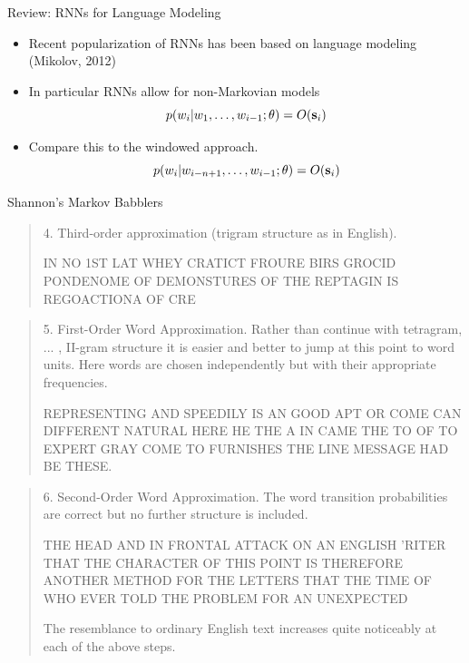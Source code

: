 \documentclass{beamer}
\begin{document}
\begin{frame}{Review: RNNs for Language Modeling}
  \begin{itemize}
  \item Recent popularization of RNNs has been based on language modeling (Mikolov, 2012)
    \air

  \item In particular RNNs allow for non-Markovian models
    \[ p(w_i | w_1, \ldots, w_{i-1};\theta) = O(\mathbf{s}_i) \]

    \air 

  \item Compare this to the windowed approach.
    \[ p(w_i | w_{i-n+1}, \ldots, w_{i-1};\theta) = O(\mathbf{s}_i) \]
  \end{itemize}
\end{frame}

\begin{frame}[allowframebreaks]{Shannon's Markov Babblers}

  \begin{quote}
   
  4. Third-order approximation (trigram structure as in English).

IN NO 1ST LAT WHEY CRATICT FROURE BIRS GROCID
PONDENOME OF DEMONSTURES OF THE REPTAGIN IS
REGOACTIONA OF CRE
  \end{quote}

  \begin{quote}
5. First-Order Word Approximation. Rather than continue with tetragram,
... , II-gram structure it is easier and better to jump at this
point to word units. Here words are chosen independently but with
their appropriate frequencies.

REPRESENTING AND SPEEDILY IS AN GOOD APT OR
COME CAN DIFFERENT NATURAL HERE HE THE A IN
CAME THE TO OF TO EXPERT GRAY COME TO FURNISHES
THE LINE MESSAGE HAD BE THESE.

  \end{quote}

  \begin{quote}
    6. Second-Order Word Approximation. The word transition probabilities
are correct but no further structure is included.

THE HEAD AND IN FRONTAL ATTACK ON AN ENGLISH
'RITER THAT THE CHARACTER OF THIS POINT IS
THEREFORE ANOTHER METHOD FOR THE LETTERS
THAT THE TIME OF WHO EVER TOLD THE PROBLEM
FOR AN UNEXPECTED

The resemblance to ordinary English text increases quite noticeably at
each of the above steps.

  \end{quote}
\end{frame}
\end{document}
